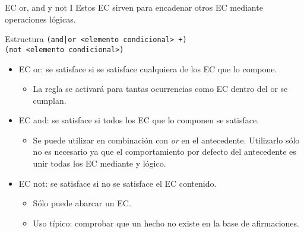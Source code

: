 \documentclass[usenames,dvipsnames,aspectratio=169]{beamer}
\begin{document}
\begin{frame}{EC or, and y not I}
	Estos EC sirven para encadenar otros EC mediante operaciones lógicas.
	\begin{block}{Estructura}
		\texttt{(and|or <elemento condicional> +)}\\
		\texttt{(not <elemento condicional>)}
	\end{block}
	\begin{itemize}
		\item EC or: se satisface si se satisface cualquiera de los EC que lo compone.
		\begin{itemize}
			\item La regla se activará para tantas ocurrencias como EC dentro del or se cumplan.
		\end{itemize}
		\item EC and: se satisface si todos los EC que lo componen se satisface.
		\begin{itemize}
			\item Se puede utilizar en combinación con \textit{or} en el antecedente. Utilizarlo sólo no es necesario ya que el comportamiento por defecto del antecedente es unir todas los EC mediante y lógico.
		\end{itemize}
		\item EC not: se satisface si no se satisface el EC contenido.
		\begin{itemize}
			\item Sólo puede abarcar un EC.
			\item Uso típico: comprobar que un hecho no existe en la base de afirmaciones.
		\end{itemize}
	\end{itemize}
\end{frame}
\end{document}
